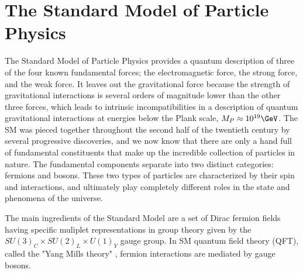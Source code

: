 \section{The Standard Model of Particle Physics}
\label{sec:sm}
The Standard Model of Particle Physics provides a quantum description of three of the four known fundamental forces; the electromagnetic force, the strong force, and the weak force.  It leaves out the gravitational force because the strength of gravitational interactions is several orders of magnitude lower than the other three forces, which leads to intrinsic incompatibilities in a description of quantum gravitational interactions at energies below the Plank scale, $M_P\approx10^{19}\GeV$.  The SM was pieced together throughout the second half of the twentieth century by several progressive discoveries, and we now know that there are only a hand full of fundamental constituents that make up the incredible collection of particles in nature.  The fundamental components separate into two distinct categories: fermions and bosons.  These two types of particles are characterized by their spin and interactions, and ultimately play completely different roles in the state and phenomena of the universe. \cite{tully}

The main ingredients of the Standard Model are a set of Dirac fermion fields having specific muliplet representations in group theory given by the $SU(3)_{C} \times SU(2)_{L} \times U(1)_{Y}$ gauge group.  In SM quantum field theory (QFT), called the "Yang Mills theory" \cite{PhysRev.96.191}, fermion interactions are mediated by gauge bosons.  %

